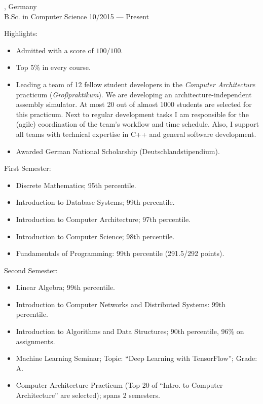 \pagebreak
\begin{entry}
	{, Germany}
	{\\B.Sc. in Computer Science}
	{10/2015 --- Present}
  \item Highlights:
  \begin{itemize}
    \item Admitted with a score of $100/100$.
    \item Top 5\% in every course.
    \item Leading a team of 12 fellow student developers in the \emph{Computer Architecture} practicum (\emph{Großpraktikum}). We are developing an architecture-independent assembly simulator. At most 20 out of almost 1000 students are selected for this practicum. Next to regular development tasks I am responsible for the (agile) coordination of the team's workflow and time schedule. Also, I support all teams with technical expertise in C++ and general software development.
    \item Awarded German National Scholarship (Deutschlandstipendium).
  \end{itemize}
  \item First Semester:
  \begin{itemize}
    \item Discrete Mathematics; 95th percentile.
    \item Introduction to Database Systems; 99th percentile.
    \item Introduction to Computer Architecture; 97th percentile.
    \item Introduction to Computer Science; 98th percentile.
    \item Fundamentals of Programming: 99th percentile (291.5/292 points).
  \end{itemize}
  \item Second Semester:
  \begin{itemize}
    \item Linear Algebra; 99th percentile.
    \item Introduction to Computer Networks and Distributed Systems: 99th percentile.
    \item Introduction to Algorithms and Data Structures; 90th percentile, 96\% on assignments.
    \item Machine Learning Seminar; Topic: ``Deep Learning with TensorFlow''; Grade: A.
    \item Computer Architecture Practicum (Top 20 of ``Intro. to Computer Architecture'' are selected); spans 2 semesters.
  \end{itemize}
\end{entry}

